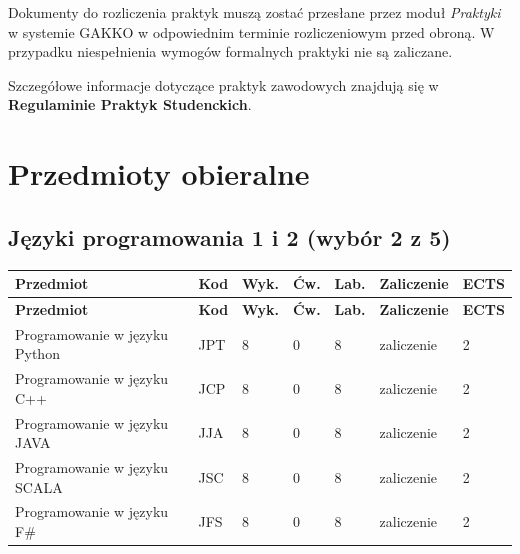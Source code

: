 \documentclass[12pt,a4paper]{article}
\newcommand{\thdrule}{\noalign{\global\setlength{\extrarowheight}{0pt}}}
\newcommand{\thdend}{\noalign{\global\setlength{\extrarowheight}{4pt}}}
\begin{document}
Dokumenty do rozliczenia praktyk muszą zostać przesłane przez moduł \textit{Praktyki} w systemie GAKKO w odpowiednim terminie rozliczeniowym przed obroną. W przypadku niespełnienia wymogów formalnych praktyki nie są zaliczane.

Szczegółowe informacje dotyczące praktyk zawodowych znajdują się w \textbf{Regulaminie Praktyk Studenckich}.

\newpage

\section{Przedmioty obieralne}


\subsection*{Języki programowania 1 i 2 (wybór 2 z 5)}

{\scriptsize
\begin{longtable}{m{5.5cm}m{0.8cm}m{1cm}m{1cm}m{1cm}m{1.7cm}m{0.7cm}}
\thdrule\toprule
\rowcolor{pjatkRed}
{\color{white}\footnotesize\textbf{\vphantom{Ag}Przedmiot}} & {\color{white}\footnotesize\textbf{\vphantom{Ag}Kod}} & {\color{white}\footnotesize\textbf{\vphantom{Ag}Wyk.}} & {\color{white}\footnotesize\textbf{\vphantom{Ag}Ćw.}} & {\color{white}\footnotesize\textbf{\vphantom{Ag}Lab.}} & {\color{white}\footnotesize\textbf{\vphantom{Ag}Zaliczenie}} & {\color{white}\footnotesize\textbf{\vphantom{Ag}ECTS}} \\
\midrule\thdend
\endfirsthead
\thdrule\toprule
\rowcolor{pjatkRed}
{\color{white}\footnotesize\textbf{\vphantom{Ag}Przedmiot}} & {\color{white}\footnotesize\textbf{\vphantom{Ag}Kod}} & {\color{white}\footnotesize\textbf{\vphantom{Ag}Wyk.}} & {\color{white}\footnotesize\textbf{\vphantom{Ag}Ćw.}} & {\color{white}\footnotesize\textbf{\vphantom{Ag}Lab.}} & {\color{white}\footnotesize\textbf{\vphantom{Ag}Zaliczenie}} & {\color{white}\footnotesize\textbf{\vphantom{Ag}ECTS}} \\
\midrule\thdend
\endhead
\rowcolor{tableRowLight} Programowanie w języku Python & JPT & 8 & 0 & 8 & {\scriptsize zaliczenie} & 2 \\
\rowcolor{tableRowAlt} Programowanie w języku C++ & JCP & 8 & 0 & 8 & {\scriptsize zaliczenie} & 2 \\
\rowcolor{tableRowLight} Programowanie w języku JAVA & JJA & 8 & 0 & 8 & {\scriptsize zaliczenie} & 2 \\
\rowcolor{tableRowAlt} Programowanie w języku SCALA & JSC & 8 & 0 & 8 & {\scriptsize zaliczenie} & 2 \\
\rowcolor{tableRowLight} Programowanie w języku F\# & JFS & 8 & 0 & 8 & {\scriptsize zaliczenie} & 2 \\
\bottomrule
\end{longtable}}
\end{document}
